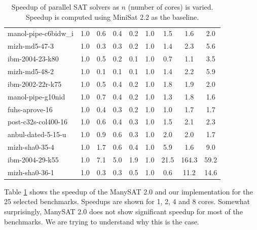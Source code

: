 \documentclass[letterpaper, compsoc, conference]{IEEEtran}
\begin{document}
\begin{table}[htbp]
\begin{center}
\begin{tabular}{|l|c|c|c|c|c|c|c|c|}
        manol-pipe-c6bidw\_i                     &    1.0 &    0.6 &    0.4 &    0.2 &    1.0 &    1.5 &    1.6 &    2.0 \\
        mizh-md5-47-3                            &    1.0 &    0.3 &    0.3 &    0.2 &    1.0 &    1.4 &    2.3 &    5.6 \\
        ibm-2004-23-k80                          &    1.0 &    0.5 &    0.2 &    0.1 &    1.0 &    0.7 &    1.1 &    3.5 \\
        mizh-md5-48-2                            &    1.0 &    0.1 &    0.1 &    0.1 &    1.0 &    1.4 &    2.2 &    5.9 \\
        ibm-2002-22r-k75                         &    1.0 &    0.5 &    0.4 &    0.2 &    1.0 &    1.8 &    1.9 &    2.0 \\
        manol-pipe-g10nid                        &    1.0 &    0.7 &    0.4 &    0.2 &    1.0 &    1.3 &    1.8 &    1.6 \\
        fuhs-aprove-16                           &    1.0 &    0.4 &    0.3 &    0.2 &    1.0 &    1.0 &    1.7 &    1.7 \\
        post-c32s-col400-16                      &    1.0 &    0.6 &    0.4 &    0.3 &    1.0 &    1.5 &    2.1 &    2.3 \\
        anbul-dated-5-15-u                       &    1.0 &    0.9 &    0.6 &    0.3 &    1.0 &    2.0 &    2.0 &    1.7 \\
        mizh-sha0-35-4                           &    1.0 &    1.7 &    0.6 &    0.4 &    1.0 &    5.9 &    1.6 &    9.0 \\
        ibm-2004-29-k55                          &    1.0 &    7.1 &    5.0 &    1.9 &    1.0 &   21.5 &  164.3 &   59.2 \\
        mizh-sha0-36-1                           &    1.0 &    0.3 &    0.3 &    0.5 &    1.0 &    0.6 &   11.2 &   14.6 \\
        \hline
    \end{tabular}
    \end{center}
    \caption{Speedup of parallel SAT solvers as $n$ (number of cores) is
    varied. Speedup is computed using MiniSat 2.2 as the baseline. }
    \label{tab:speedup}
\end{table}
Table \ref{tab:speedup} shows the speedup of the ManySAT 2.0 and our
implementation for the 25 selected benchmarks. Speedups are shown for 1, 2, 4
and 8 cores. Somewhat surprisingly, ManySAT 2.0 does not show significant
speedup for most of the benchmarks. We are trying to understand why this
is the case.
\end{document}

